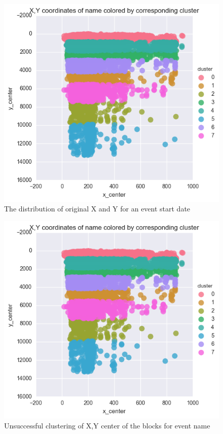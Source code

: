 \begin{figure}[h]
\begin{center}
\includegraphics[width=1.0\textwidth]{figures07/nameXYCluster8}
\caption{The distribution of original X and Y for an event start date}
\label{fig:startDateXY}
\end{center}
\end{figure}


\begin{figure}[h]
\begin{center}
\includegraphics[width=1.0\textwidth]{figures07/nameXYCluster8}
\caption{Unsuccessful clustering of X,Y center of the blocks for event name}
\label{fig:nameXYCluster8}
\end{center}
\end{figure}
    
